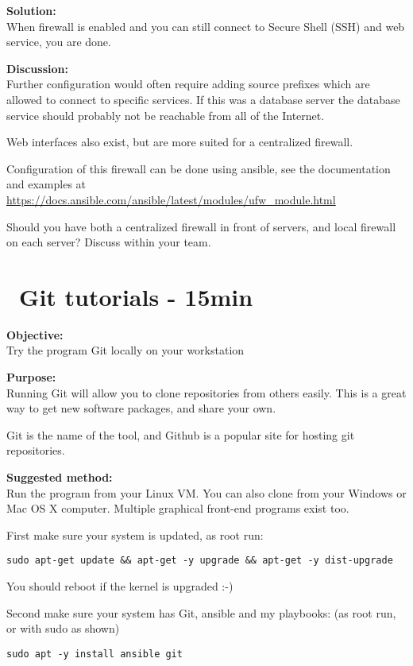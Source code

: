 \documentclass[a4paper,11pt,notitlepage]{report}
\begin{document}
{\bf Solution:}\\
When firewall is enabled and you can still connect to Secure Shell (SSH) and web service, you are done.

{\bf Discussion:}\\
Further configuration would often require adding source prefixes which are allowed to connect to specific services. If this was a database server the database service should probably not be reachable from all of the Internet.

Web interfaces also exist, but are more suited for a centralized firewall.

Configuration of this firewall can be done using ansible, see the documentation and examples at \url{https://docs.ansible.com/ansible/latest/modules/ufw_module.html}

Should you have both a centralized firewall in front of servers, and local firewall on each server? Discuss within your team.


\chapter{\faExclamationTriangle\ Git tutorials - 15min}
\label{ex:git-tutorial}



{\bf Objective:}\\
Try the program Git locally on your workstation

{\bf Purpose:}\\
Running Git will allow you to clone repositories from others easily. This is a great way to get new software packages, and share your own.

Git is the name of the tool, and Github is a popular site for hosting git repositories.

{\bf Suggested method:}\\
Run the program from your Linux VM. You can also clone from your Windows or Mac OS X computer. Multiple graphical front-end programs exist too.


First make sure your system is updated, as root run:

\begin{verbatim}
sudo apt-get update && apt-get -y upgrade && apt-get -y dist-upgrade
\end{verbatim}
You should reboot if the kernel is upgraded :-)

Second make sure your system has Git, ansible and my playbooks: (as root run, or with sudo as shown)
\begin{verbatim}
sudo apt -y install ansible git
\end{verbatim}
\end{document}
